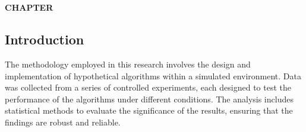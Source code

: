 \chapter*{}  %

\setcounter{chapter}{3}  %
\setcounter{section}{0}  %
\setcounter{subsection}{0}  %
\setcounter{subsubsection}{0}  %

\vspace*{-50mm}


\vspace*{10mm}  %

\begin{center}
    \textbf{CHAPTER \thechapter}\\
    \vspace{5mm}  %
    \textbf{\chapterTHREEtopic}
\end{center}

\vspace{10mm}  %

\section{Introduction}

\setlength{\parindent}{1cm}  %

\begin{spacing}{2}  %

The methodology employed in this research involves the design and implementation of hypothetical algorithms within a simulated environment. Data was collected from a series of controlled experiments, each designed to test the performance of the algorithms under different conditions. The analysis includes statistical methods to evaluate the significance of the results, ensuring that the findings are robust and reliable.

\end{spacing}
